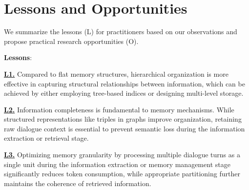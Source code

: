 \section{Lessons and Opportunities}
\label{sec:lessons_opp}


We summarize the lessons (L) for practitioners based on our observations and propose practical research opportunities (O).

\noindent \textbf{Lessons}:  

\noindent {} \textbf{\underline{L1.}}
Compared to flat memory structures, hierarchical organization is more effective in capturing structural relationships between information, which can be achieved by either employing tree-based indices or designing multi-level storage.


\noindent {} \textbf{\underline{L2.}}
Information completeness is fundamental to memory mechanisms. While structured representations like triples in graphs improve organization, retaining raw dialogue context is essential to prevent semantic loss during the information extraction or retrieval stage.


\noindent {} \textbf{\underline{L3.}}
Optimizing memory granularity by processing multiple dialogue turns as a single unit during the information extraction or memory management stage significantly reduces token consumption, while appropriate partitioning further maintains the coherence of retrieved information.





